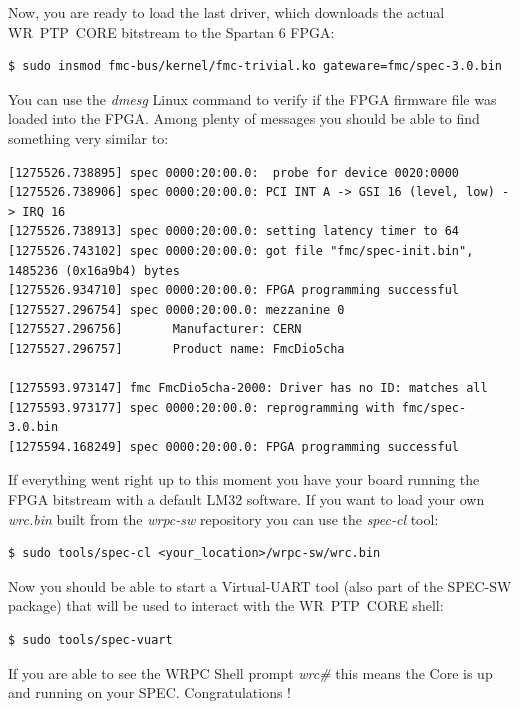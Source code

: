 \documentclass[a4paper, 12pt]{article}
\newcommand{\codeHook}[1]{\mbox{\ttfamily\MakeTextUppercase{#1}}}
\begin{document}
\vspace{1em}
Now, you are ready to load the last driver, which downloads the actual
\codeHook{wr ptp core} bitstream to the Spartan 6 FPGA:
\begin{lstlisting}
$ sudo insmod fmc-bus/kernel/fmc-trivial.ko gateware=fmc/spec-3.0.bin
\end{lstlisting}

You can use the \textit{dmesg} Linux command to verify if the FPGA firmware file was
loaded into the FPGA. Among plenty of messages you should be able to find
something very similar to:

\begin{lstlisting}[basicstyle=\tiny]
[1275526.738895] spec 0000:20:00.0:  probe for device 0020:0000
[1275526.738906] spec 0000:20:00.0: PCI INT A -> GSI 16 (level, low) -> IRQ 16
[1275526.738913] spec 0000:20:00.0: setting latency timer to 64
[1275526.743102] spec 0000:20:00.0: got file "fmc/spec-init.bin", 1485236 (0x16a9b4) bytes
[1275526.934710] spec 0000:20:00.0: FPGA programming successful
[1275527.296754] spec 0000:20:00.0: mezzanine 0
[1275527.296756]       Manufacturer: CERN
[1275527.296757]       Product name: FmcDio5cha

[1275593.973147] fmc FmcDio5cha-2000: Driver has no ID: matches all
[1275593.973177] spec 0000:20:00.0: reprogramming with fmc/spec-3.0.bin
[1275594.168249] spec 0000:20:00.0: FPGA programming successful
\end{lstlisting}

If everything went right up to this moment you have your board running the FPGA 
bitstream with a default \codeHook{lm32} software. If you want to load your own
\textit{wrc.bin} built from the \textit{wrpc-sw} repository you can use the \textit{spec-cl}
tool:

\begin{lstlisting}
$ sudo tools/spec-cl <your_location>/wrpc-sw/wrc.bin
\end{lstlisting}

\vspace{1em}
Now you should be able to start a Virtual-UART tool (also part of the
\codeHook{spec-sw} package) that will be used to interact with the \codeHook{wr ptp core}
shell:

\begin{lstlisting}
$ sudo tools/spec-vuart
\end{lstlisting}

If you are able to see the \codeHook{wrpc} Shell prompt \textit{wrc\#} this means the Core
is up and running on your \codeHook{spec}. Congratulations !
\end{document}

